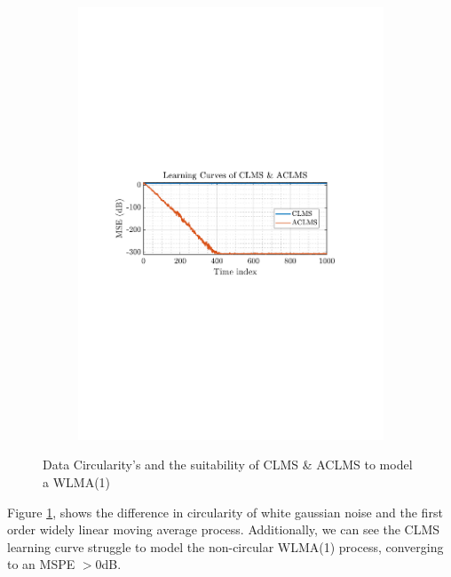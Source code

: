 \documentclass[12pt]{article}
\begin{document}
\begin{figure}[H]
\begin{subfigure}{0.49\textwidth}
					\includegraphics[trim={2.2cm 11.2cm 3.00cm  11.2cm}, clip, width=\textwidth]{../MATLAB/figures/q3_1a_fig02.pdf} 
					\captionsetup{justification=centering}
				\end{subfigure}
				
				\captionsetup{justification=centering}
				\caption{Data Circularity's and the suitability of CLMS \& ACLMS to model a WLMA(1) }
				\label{fig: 3-1a}
			\end{figure}
			
			Figure \ref{fig: 3-1a}, shows the difference in circularity of white gaussian noise and the first order widely linear moving average process. Additionally, we can see the CLMS learning curve struggle to model the non-circular WLMA(1) process, converging to an MSPE $>0$dB.
			
\end{document}
